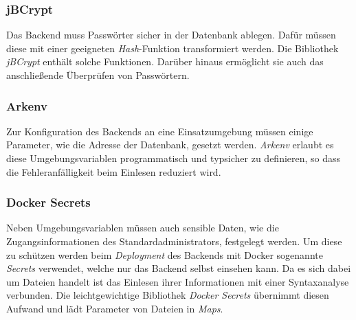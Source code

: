 \documentclass[a4paper, 11pt]{article}
\begin{document}
\subsubsection{jBCrypt}
\label{subsubsec:backend:bibs:jbcrypt}
Das Backend muss Passwörter sicher in der Datenbank ablegen.
Dafür müssen diese mit einer geeigneten \textit{Hash}-Funktion transformiert werden.
Die Bibliothek \textit{jBCrypt} enthält solche Funktionen.
Darüber hinaus ermöglicht sie auch das anschließende Überprüfen von Passwörtern.

\subsubsection{Arkenv}
\label{subsubsec:backend:bibs:arkenv}
Zur Konfiguration des Backends an eine Einsatzumgebung müssen einige Parameter, wie die Adresse der Datenbank, gesetzt werden.
\textit{Arkenv} erlaubt es diese Umgebungsvariablen programmatisch und typsicher zu definieren, so dass die Fehleranfälligkeit beim Einlesen reduziert wird.

\subsubsection{Docker Secrets}
\label{subsubsec:backend:bibs:dockersecrets}
Neben Umgebungsvariablen müssen auch sensible Daten, wie die Zugangsinformationen des Standardadministrators, festgelegt werden.
Um diese zu schützen werden beim \textit{Deployment} des Backends mit Docker sogenannte \textit{Secrets} verwendet, welche nur das Backend selbst einsehen kann.
Da es sich dabei um Dateien handelt ist das Einlesen ihrer Informationen mit einer Syntaxanalyse verbunden.
Die leichtgewichtige Bibliothek \textit{Docker Secrets} übernimmt diesen Aufwand und lädt Parameter von Dateien in \textit{Maps}.
\end{document}
